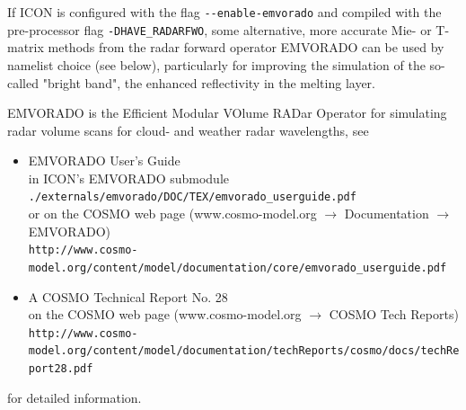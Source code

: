   If ICON is configured with the flag \verb+--enable-emvorado+ and compiled with
  the pre-processor flag \verb+-DHAVE_RADARFWO+, some alternative, more accurate
  Mie- or T-matrix methods from the radar forward operator EMVORADO can be used by namelist choice (see below), particularly for
  improving the simulation of the so-called "bright band", the enhanced reflectivity in the melting layer.

%
EMVORADO is the Efficient Modular VOlume RADar Operator for simulating radar volume scans for cloud- and weather radar wavelengths, see
\begin{itemize}
\item EMVORADO User's Guide\\
  in ICON's EMVORADO submodule \verb+./externals/emvorado/DOC/TEX/emvorado_userguide.pdf+\\
  or on the COSMO web page (\mbox{www.cosmo-model.org} $\rightarrow$ Documentation $\rightarrow$ EMVORADO)\\
  \verb+http://www.cosmo-model.org/content/model/documentation/core/emvorado_userguide.pdf+
\item A COSMO Technical Report No. 28\\
  on the COSMO web page (\mbox{www.cosmo-model.org} $\rightarrow$ COSMO Tech Reports)\\
  \verb+http://www.cosmo-model.org/content/model/documentation/techReports/cosmo/docs/techReport28.pdf+
\end{itemize}
for detailed information.

